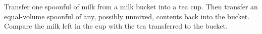 Transfer one spoonful of milk from a milk bucket into a tea cup. Then transfer an equal-volume spoonful of any, possibly unmixed, contents back into the bucket. Compare the milk left in the cup with the tea transferred to the bucket.
